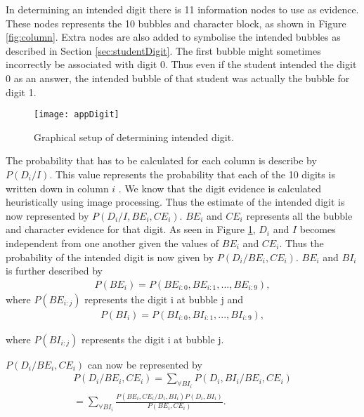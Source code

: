 In determining an intended digit there is 11 information nodes to use as evidence. These nodes represents the 10 bubbles and character block, as shown in Figure \ref{fig:column}. Extra nodes are also added to symbolise the intended bubbles as described in Section \ref{sec:studentDigit}. The first bubble might sometimes incorrectly be associated with digit 0. Thus even if the student intended the digit 0 as an answer, the intended bubble of that student was actually the bubble for digit 1.

\begin{figure}
  \centering
  \texttt{[image: appDigit]}\\
  \caption{Graphical setup of determining intended digit.}
  \label{fig:appDigit}
\end{figure}

The probability that has to be calculated for each column is describe by $P(D_i/I)$. This value represents the probability that each of the 10 digits is written down in column $i$ . We know that the digit evidence is calculated heuristically using image processing. Thus the estimate of the intended digit is now represented by $P(D_i/I,BE_i,CE_i)$. $BE_i$ and $CE_i$ represents all the bubble and character evidence for that digit. As seen in Figure \ref{fig:appDigit}, $D_i$ and $I$ becomes independent from one another given the values of $BE_i$ and $CE_i$. Thus the probability of the intended digit is now given by $P(D_i/BE_i,CE_i)$.
$BE_i$ and $BI_i$ is further described by 
\begin{align}
  P(BE_i) =  P(BE_{i:0},BE_{i:1},...,BE_{i:9}),
\label{eqn:ansIndep}
\end{align}
where  $P(BE_{i:j})$ represents the digit i at bubble j and
\begin{align}
  P(BI_i) =  P(BI_{i:0},BI_{i:1},...,BI_{i:9}),
\label{eqn:ansIndep}
\end{align}

where  $P(BI_{i:j})$ represents the digit i at bubble j.

$P(D_i/BE_i,CE_i)$ can now be represented by
\begin{align}
  P(D_i/BE_i,CE_i)	=  \sum_{\forall BI_i}^{}  P(D_i,BI_i/BE_i,CE_i)\\
  					=  \sum_{\forall BI_i}^{}  \frac{P(BE_i,CE_i/D_i,BI_i)P(D_i,BI_i)}{P(BE_i,CE_i)}.
\label{eqn:ansEqn2}
\end{align}

